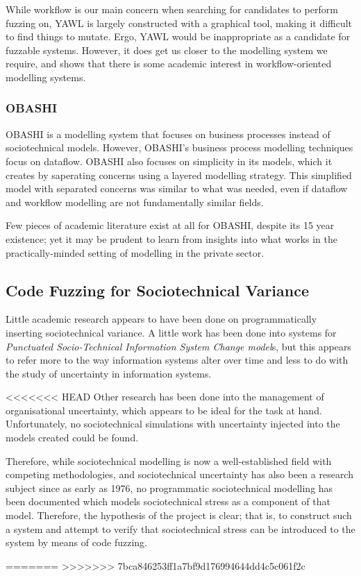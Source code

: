 \documentclass{sig-alternate}
\begin{document}
While workflow is our main concern when searching for candidates to perform fuzzing on, YAWL is largely constructed with a graphical tool, making it difficult to find things to mutate. Ergo, YAWL would be inappropriate as a candidate for fuzzable systems. However, it does get us closer to the modelling system we require, and shows that there is some academic interest in workflow-oriented modelling systems. \par

\subsubsection{OBASHI}
OBASHI\cite{ObashiMethodology} is a modelling system that focuses on business processes instead of sociotechnical models. However, OBASHI's business process modelling techniques focus on dataflow. OBASHI also focuses on simplicity in its models, which it creates by saperating concerns using a layered modelling strategy. This simplified model with separated concerns was similar to what was needed, even if dataflow and workflow modelling are not fundamentally similar fields. \par 

Few pieces of academic literature exist at all for OBASHI, despite its 15 year existence; yet it may be prudent to learn from insights into what works in the practically-minded setting of modelling in the private sector. \par

\subsection{Code Fuzzing for Sociotechnical Variance}
Little academic research appears to have been done on programmatically inserting sociotechnical variance. A little work has been done into systems for \emph{Punctuated Socio-Technical Information System Change model}s\cite{Lyytinen2008}, but this appears to refer more to the way information systems alter over time and less to do with the study of uncertainty in information systems. \par
<<<<<<< HEAD
Other research has been done into the management of organisational uncertainty\cite{grote2004uncertainty}\cite{Herrmann1999}, which appears to be ideal for the task at hand. Unfortunately, no sociotechnical simulations with uncertainty injected into the models created could be found. \par
Therefore, while sociotechnical modelling is now a well-established field with competing methodologies, and sociotechnical uncertainty has also been a research subject since as early as 1976\cite{Susman1976}, no programmatic sociotechnical modelling has been documented which models sociotechnical stress as a component of that model. Therefore, the hypothesis of the project is clear; that is, to construct such a system and attempt to verify that sociotechnical stress can be introduced to the system by means of code fuzzing. \par
=======
>>>>>>> 7bca846253ff1a7bf9d176994644dd4c5c061f2c
\end{document}
